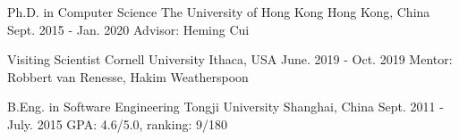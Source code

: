

\begin{cventries}


\cventry
{Ph.D. in Computer Science} %
{The University of Hong Kong} %
{Hong Kong, China} %
{Sept. 2015 - Jan. 2020} %
{ %
Advisor: Heming Cui
}


\cventry
{Visiting Scientist} %
{Cornell University} %
{Ithaca, USA} %
{June. 2019 - Oct. 2019} %
{ %
Mentor: Robbert van Renesse, Hakim Weatherspoon
}


\cventry
{B.Eng. in Software Engineering} %
{Tongji University} %
{Shanghai, China} %
{Sept. 2011 - July. 2015} %
{ %
GPA: 4.6/5.0, ranking: 9/180
}

\end{cventries}